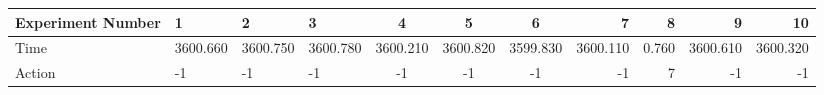 \documentclass[8pt]{article}
\begin{document}
\begin{landscape}
\begin{tabular}{ | l | l | l | l | c | c | c | r | r | r | r | }
 \hline 
Experiment Number & 1 & 2 & 3 & 4 & 5 & 6 & 7 & 8 & 9 & 10\\ \hline
Time & 3600.660 & 3600.750 & 3600.780 & 3600.210 & 3600.820 & 3599.830 & 3600.110 & 0.760 & 3600.610 & 3600.320\\ \hline
Action & -1 & -1 & -1 & -1 & -1 & -1 & -1 & 7 & -1 & -1\\ \hline\end{tabular}
\end{landscape}
\end{document}
